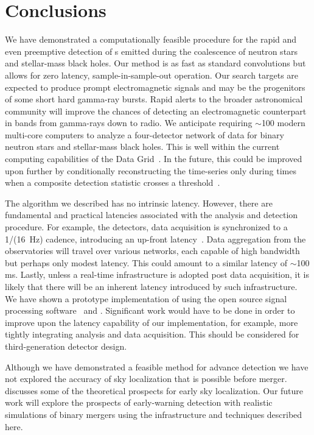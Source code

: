 \section{Conclusions}
\label{sec:conclusions}

We have demonstrated a computationally feasible procedure for the rapid and
even preemptive detection of \GW{}s emitted during the coalescence
of neutron stars and stellar-mass black holes. Our method is as fast as
standard \fft{} convolutions but allows for zero latency, sample-in-sample-out
operation.  Our search targets are expected to produce prompt electromagnetic
signals and may be the progenitors of some short hard gamma-ray bursts.  Rapid
alerts to the broader astronomical community will improve the chances of
detecting an electromagnetic counterpart in bands from gamma-rays down to
radio.  We anticipate requiring $\sim$100 modern multi-core computers to
analyze a four-detector network of \GW{} data for binary neutron
stars and stellar-mass black holes.  This is well within the current computing
capabilities of the \LIGO{} Data Grid~\citep{LDG}. In the future, this could be
improved upon further by conditionally reconstructing the \SNR{} time-series
only during times when a composite detection statistic crosses a
threshold~\citep{svd-compdetstat}.

The algorithm we described has no intrinsic latency.  However, there are
fundamental and practical latencies associated with the analysis and detection
procedure. For example, the \LIGO{} detectors, data acquisition is synchronized
to a 1/(16~Hz) cadence, introducing an up-front latency~\citep{Bork2001}. Data
aggregation from the observatories will travel over various networks, each
capable of high bandwidth but perhaps only modest latency.  This could amount to
a similar latency of $\sim$100 ms.  Lastly, unless a real-time infrastructure
is adopted post data acquisition, it is likely that there will be an inherent
latency introduced by such infrastructure.  We have shown a prototype
implementation of \lloid{} using the open source signal processing software
\gstreamer\ and \gstlal. Significant work would have to be done in order to
improve upon the latency capability of our implementation, for example, more
tightly integrating analysis and data acquisition. This should be considered
for third-generation detector design.

Although we have demonstrated a feasible method for advance detection we have
not explored the accuracy of sky localization that is possible before merger.
\citet{Fairhurst2009} discusses some of the theoretical prospects for early
sky localization.  Our future work will explore the prospects of early-warning
detection with realistic simulations of binary mergers using the infrastructure
and techniques described here. 

